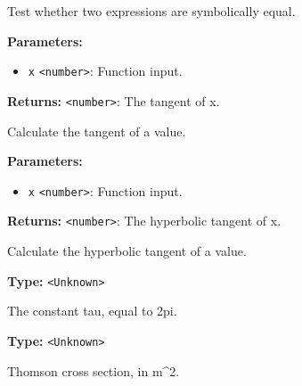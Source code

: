 \documentclass[12pt,a4paper]{article}
\begin{document}
\noindent Test whether two expressions are symbolically equal.

\vspace{5mm}
\noindent {}


\noindent \textbf{Parameters:}
\begin{itemize}
  \item \texttt{x} \texttt{<number>}: Function input.
\end{itemize}

\noindent \textbf{Returns:} \texttt{<number>}: The tangent of x.

\noindent Calculate the tangent of a value.

\vspace{5mm}
\noindent {}


\noindent \textbf{Parameters:}
\begin{itemize}
  \item \texttt{x} \texttt{<number>}: Function input.
\end{itemize}

\noindent \textbf{Returns:} \texttt{<number>}: The hyperbolic tangent of x.

\noindent Calculate the hyperbolic tangent of a value.

\vspace{5mm}
\noindent {}\vspace{4mm}


\noindent \textbf{Type:} \texttt{<Unknown>}

\noindent The constant tau, equal to 2pi.

\vspace{5mm}
\noindent {}\vspace{4mm}


\noindent \textbf{Type:} \texttt{<Unknown>}

\noindent Thomson cross section, in m\textasciicircum{}2.

\vspace{5mm}
\noindent {}
\end{document}
